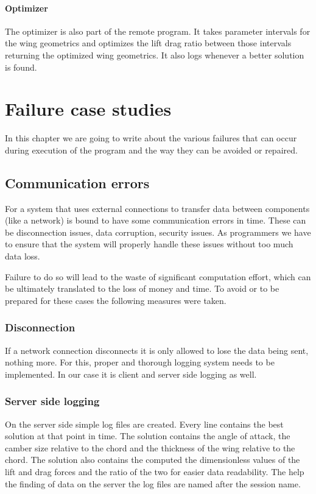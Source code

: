 \documentclass[10pt,a4paper]{report}
\begin{document}
\subsubsection{Optimizer}
The optimizer is also part of the remote program. It takes parameter intervals for the wing geometrics and optimizes the lift drag ratio between those intervals returning the optimized wing geometrics. It also logs whenever a better solution is found.

\chapter{Failure case studies}
In this chapter we are going to write about the various failures that can occur during execution of the program and the way they can be avoided or repaired.

\section{Communication errors}
For a system that uses external connections to transfer data between components (like a network) is bound to have some communication errors in time. These can be disconnection issues, data corruption, security issues. As programmers we have to ensure that the system will properly handle these issues without too much data loss.

Failure to do so will lead to the waste of significant computation effort, which can be ultimately translated to the loss of money and time. To avoid or to be prepared for these cases the following measures were taken.

\subsection{Disconnection}
If a network connection disconnects it is only allowed to lose the data being sent, nothing more. For this, proper and thorough logging system needs to be implemented. In our case it is client and server side logging as well.

\subsection{Server side logging}
On the server side simple log files are created. Every line contains the best solution at that point in time. The solution contains the angle of attack, the camber size relative to the chord and the thickness of the wing relative to the chord. The solution also contains the computed the dimensionless values of the lift and drag forces and the ratio of the two for easier data readability. The help the finding of data on the server the log files are named after the session name.
\end{document}
